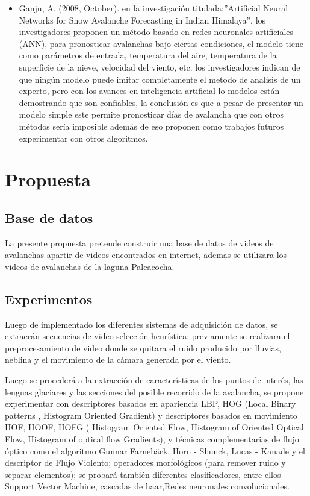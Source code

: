 \documentclass[a4paper,11pt]{report}
\begin{document}
\begin{itemize}
	\item
Ganju, A. (2008, October). en la investigación titulada:”Artificial Neural Networks for Snow Avalanche Forecasting in Indian Himalaya”, los investigadores proponen un método basado en redes neuronales artificiales (ANN), para pronosticar avalanchas bajo ciertas condiciones, el modelo tiene como parámetros de entrada, temperatura del aire, temperatura de la superficie de la nieve, velocidad del viento, etc. los investigadores indican de que ningún modelo puede imitar completamente el metodo de analisis de un experto, pero con los avances en inteligencia artificial lo modelos están demostrando que son confiables, la conclusión es que a pesar de presentar un modelo simple este permite pronosticar días de avalancha que con otros métodos sería imposible además de eso proponen como trabajos futuros experimentar con otros algoritmos.



	
\end{itemize}

\chapter{Propuesta}



\section{Base de datos}

La presente propuesta pretende construir una base de datos de videos de avalanchas apartir de videos encontrados en internet, ademas se utilizara los videos de avalanchas de la laguna Palcacocha. 
\section{Experimentos}

Luego de implementado los diferentes sistemas de adquisición de datos, se extraerán secuencias de video selección heurística; previamente se realizara el preprocesamiento de video donde se quitara el ruido producido por lluvias, neblina y el movimiento de la cámara generada por el viento.

Luego se procederá a la extracción de características de los puntos de interés, las lenguas glaciares y las secciones del posible recorrido de la avalancha, se propone experimentar con descriptores  basados en apariencia LBP, HOG (Local Binary patterns
, Histogram Oriented Gradient) y descriptores basados en movimiento HOF, HOOF, HOFG ( Histogram Oriented Flow, Histogram of Oriented Optical Flow, Histogram of optical flow Gradients),  y técnicas complementarias de flujo óptico como el algoritmo Gunnar Farnebäck, Horn - Shunck, Lucas - Kanade  y el descriptor de Flujo Violento; operadores  morfológicos (para remover ruido y separar elementos); se probará también diferentes clasificadores, entre ellos Support Vector Machine, cascadas de haar,Redes neuronales convolucionales. 
\end{document}
